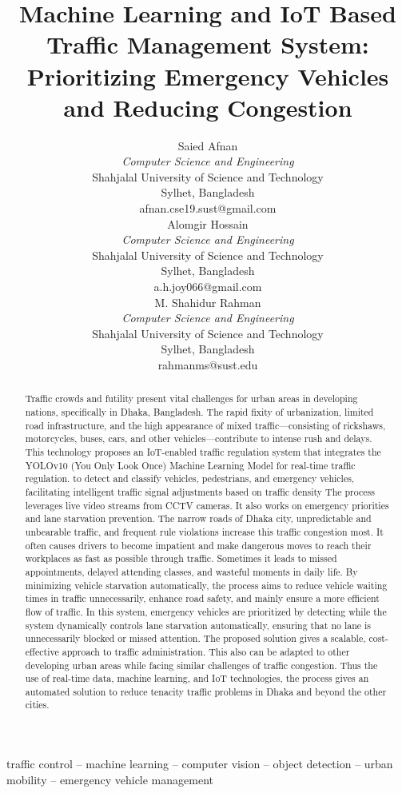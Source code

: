 \documentclass[usenatbib]{tjaa}
\title[]{\centering Machine Learning and IoT Based Traffic Management System: Prioritizing Emergency Vehicles and Reducing Congestion}
\author[]{
    \begin{minipage}[t]{0.32\textwidth}
        \centering
        \normalsize
         Saied Afnan
        \\ 
        \textit{\normalsize Computer Science and Engineering} \\
        \normalsize Shahjalal University of Science and Technology \\
        \normalsize Sylhet, Bangladesh \\
        \normalsize afnan.cse19.sust@gmail.com
    \end{minipage}
    \hspace{0.01\textwidth} %
    \begin{minipage}[t]{0.32\textwidth}
        \centering
        \normalsize
        Alomgir Hossain
        \\
        \textit{\normalsize Computer Science and Engineering} \\
        \normalsize Shahjalal University of Science and Technology \\
        \normalsize Sylhet, Bangladesh \\
        \normalsize a.h.joy066@gmail.com
    \end{minipage}
    \hspace{0.01\textwidth} %
    \begin{minipage}[t]{0.32\textwidth}
        \centering
        \normalsize
        M. Shahidur Rahman
        \\
        \textit{\normalsize Computer Science and Engineering} \\
        \normalsize Shahjalal University of Science and Technology \\
        \normalsize Sylhet, Bangladesh \\
        \normalsize rahmanms@sust.edu
    \end{minipage}
}
\begin{document}
\label{firstpage}
\pagerange{\pageref{firstpage}--\pageref{lastpage}}

\begin{abstract}
Traffic crowds and futility present vital challenges for urban areas in developing nations, specifically in Dhaka, Bangladesh. The rapid fixity of urbanization, limited road infrastructure, and the high appearance of mixed traffic—consisting of rickshaws, motorcycles, buses, cars, and other vehicles—contribute to intense rush and delays. This technology proposes an IoT-enabled traffic regulation system that integrates the YOLOv10 (You Only Look Once) Machine Learning Model for real-time traffic regulation. to detect and classify vehicles, pedestrians, and emergency vehicles, facilitating intelligent traffic signal adjustments based on traffic density The process leverages live video streams from CCTV cameras. It also works on emergency priorities and lane starvation prevention. The narrow roads of Dhaka city, unpredictable and unbearable traffic, and frequent rule violations increase this traffic congestion most. It often causes drivers to become impatient and make dangerous moves to reach their workplaces as fast as possible through traffic. Sometimes it leads to missed appointments, delayed attending classes, and wasteful moments in daily life. By minimizing vehicle starvation automatically, the process aims to reduce vehicle waiting times in traffic unnecessarily, enhance road safety, and mainly ensure a more efficient flow of traffic. In this system, emergency vehicles are prioritized by detecting while the system dynamically controls lane starvation automatically, ensuring that no lane is unnecessarily blocked or missed attention. The proposed solution gives a scalable, cost-effective approach to traffic administration. This also can be adapted to other developing urban areas while facing similar challenges of traffic congestion.  Thus the use of real-time data, machine learning, and IoT technologies, the process gives an automated solution to reduce tenacity traffic problems in Dhaka and beyond the other cities.
\end{abstract}


\begin{keywords}
traffic control -- machine learning -- computer vision -- object detection -- urban mobility -- emergency vehicle management
\end{keywords}
\end{document}
